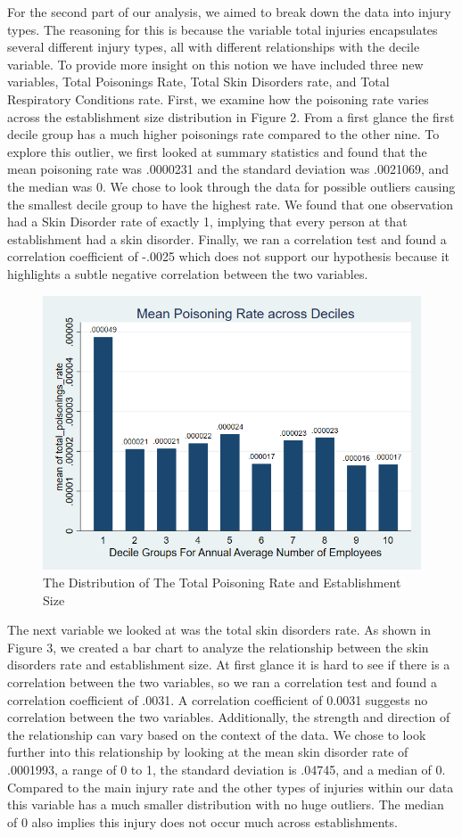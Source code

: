 \documentclass[12pt]{article}
\begin{document}
For the second part of our analysis, we aimed to break down the data into injury types. The reasoning for this is because the variable total injuries encapsulates several different injury types, all with different relationships with the decile variable. To provide more insight on this notion we have included three new variables, Total Poisonings Rate, Total Skin Disorders rate, and Total Respiratory Conditions rate. First, we examine how the poisoning rate varies across the establishment size distribution in Figure 2. From a first glance the first decile group has a much higher poisonings rate compared to the other nine. To explore this outlier, we first looked at summary statistics and found that the mean poisoning rate was .0000231 and the standard deviation was .0021069, and the median was 0. We chose to look through the data for possible outliers causing the smallest decile group to have the highest rate. We found that one observation had a Skin Disorder rate of exactly 1, implying that every person at that establishment had a skin disorder. Finally, we ran a correlation test and found a correlation coefficient of -.0025 which does not support our hypothesis because it highlights a subtle negative correlation between the two variables.

\begin{figure}
    \centering
    \includegraphics[width=0.7\linewidth]{PoisoningsDecileBar (2).png}
    \caption{The Distribution of The Total Poisoning Rate and Establishment Size}
    \label{Figure 2:}
\end{figure}


The next variable we looked at was the total skin disorders rate. As shown in Figure 3, we created a bar chart to analyze the relationship between the skin disorders rate and establishment size. At first glance it is hard to see if there is a correlation between the two variables, so we ran a correlation test and found a correlation coefficient of .0031. A correlation coefficient of 0.0031 suggests no correlation between the two variables. Additionally, the strength and direction of the relationship can vary based on the context of the data. We chose to look further into this relationship by looking at the mean skin disorder rate of .0001993, a range of 0 to 1, the standard deviation is .04745, and a median of 0. Compared to the main injury rate and the other types of injuries within our data this variable has a much smaller distribution with no huge outliers. The median of 0 also implies this injury does not occur much across establishments. 
\end{document}
